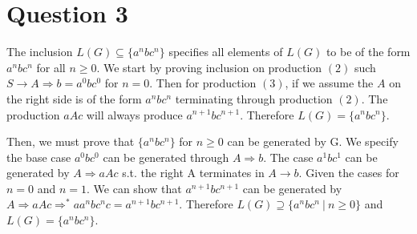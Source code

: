 \documentclass[12pt, letter]{article}
\begin{document}
\section*{Question 3}

The inclusion $L(G) \subseteq \{a^n b c^n\}$ specifies all elements of $L(G)$ to be of the form $a^n b c^n$ for all $n \geq 0$. We start by proving inclusion on production $(2)$ such 
$ S \rightarrow A \Rightarrow b = a^0 b c^0 $ for $ n = 0 $. Then for production $ (3) $, if we assume the $A$ on the right side is of the form $a^n b c^n$ terminating through production $(2)$. The production $aAc$ will always produce $a^{n+1} b c^{n+1}$. Therefore $L(G) = \{a^n b c^n\}$.

Then, we must prove that $\{a^n b c^n\}$ for $n \geq 0$ can be generated by G. We specify the base case $a^0 b c^0 $ can be generated through $ A \Rightarrow b $. The case $a^1 b c^1 $ can be generated by $ A \Rightarrow aAc $ s.t. the right A terminates in $ A \rightarrow b $. Given the cases for $n = 0$ and $n = 1$. We can show that  $a^{n+1} b c^{n+1}$ can be generated by $ A \Rightarrow aAc \Rightarrow^*aa^nbc^nc = a^{n+1} b c^{n+1} $. Therefore $L(G) \supseteq \{a^n b c^n\ |\ n \geq 0\} $ and $L(G) = \{a^n b c^n\}$. 
\end{document}
